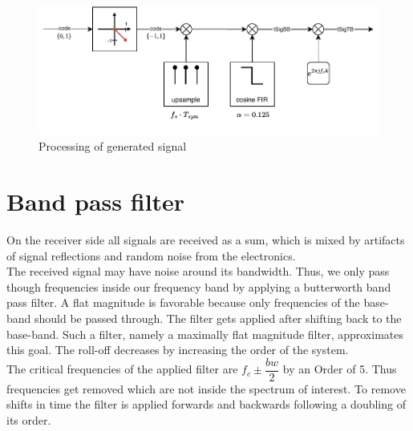 %
%
\begin{figure}[h]
	\includegraphics[width=\linewidth]{images/sensig}
	
	\caption{Processing of generated signal}
	\label{fig:sensig}
\end{figure}


\section{Band pass filter}
On the receiver side all signals are received as a sum, which is mixed by artifacts of signal reflections and random noise from the electronics.\\
The received signal may have noise around its bandwidth. Thus, we only pass though frequencies inside our frequency band by applying a butterworth band pass filter.
A flat magnitude is favorable because only frequencies of the base-band should be passed through. 
The filter gets applied after shifting back to the base-band. Such a filter, namely a maximally flat magnitude filter, approximates this goal. The roll-off decreases by increasing the order of the system.\\
The critical frequencies of the applied filter are $f_c\pm\dfrac{bw}{2}$ by an Order of 5. Thus frequencies get removed which are not inside the spectrum of interest. To remove shifts in time the filter is applied forwards and backwards following a doubling of its order.

